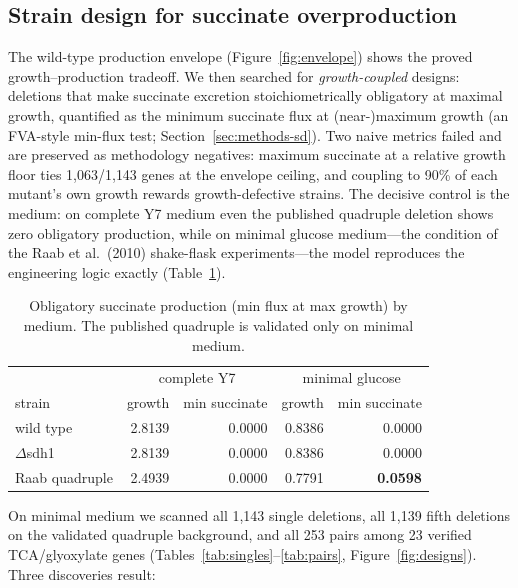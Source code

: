 \documentclass[12pt]{article}
\begin{document}
\subsection{Strain design for succinate overproduction}
The wild-type production envelope (Figure~\ref{fig:envelope}) shows the
proved growth--production tradeoff. We then searched for
\emph{growth-coupled} designs: deletions that make succinate excretion
stoichiometrically obligatory at maximal growth, quantified as the minimum
succinate flux at (near-)maximum growth (an FVA-style min-flux test;
Section~\ref{sec:methods-sd}). Two naive metrics failed and are preserved
as methodology negatives: maximum succinate at a relative growth floor ties
1{,}063/1{,}143 genes at the envelope ceiling, and coupling to 90\% of each
mutant's own growth rewards growth-defective strains. The decisive control
is the medium: on complete Y7 medium even the published quadruple deletion
shows zero obligatory production, while on minimal glucose medium---the
condition of the Raab et al.\ (2010) shake-flask experiments---the model
reproduces the engineering logic exactly (Table~\ref{tab:validation}).
\begin{table}[h]
\centering\small
\caption{Obligatory succinate production (min flux at max growth) by
medium. The published quadruple is validated only on minimal medium.}
\label{tab:validation}
\begin{tabular}{lrrrr}
\hline\hline
 & \multicolumn{2}{c}{complete Y7} & \multicolumn{2}{c}{minimal glucose}\\
strain & growth & min succinate & growth & min succinate\\
\hline
wild type & 2.8139 & 0.0000 & 0.8386 & 0.0000\\
$\Delta$sdh1 & 2.8139 & 0.0000 & 0.8386 & 0.0000\\
Raab quadruple & 2.4939 & 0.0000 & 0.7791 & \textbf{0.0598}\\
\hline
\end{tabular}
\end{table}
On minimal medium we scanned all 1{,}143 single deletions, all 1{,}139
fifth deletions on the validated quadruple background, and all 253 pairs
among 23 verified TCA/glyoxylate genes
(Tables~\ref{tab:singles}--\ref{tab:pairs},
Figure~\ref{fig:designs}). Three discoveries result:
\end{document}
